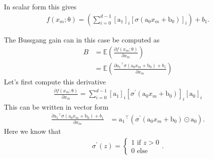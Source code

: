 \documentclass[12pt]{article}
\newcommand{\vect}[1]{\boldsymbol{\mathrm{#1}}}
\newcommand{\expt}[1]{\mathbb{E}\left(#1\right)}
\theoremstyle{remark}
\begin{document}
In scalar form this gives
\begin{align}
	f(x_m; \vect{\theta}) = \left(\sum_{i=0}^{d-1} [\vect{a_1}]_i [\sigma(\vect{a_0}x_m+\vect{b_0})]_i \right)+ b_1.
\end{align}

The Bussgang gain can in this case be computed as
\begin{align}
	B &= \expt{\frac{\partial f(x_m; \vect{\theta})}{\partial x_m}}\\
	&= \expt{\frac{\partial \vect{a_1}^{\intercal}\sigma(\vect{a_0}x_m + \vect{b_0}) + b_1 }{\partial x_m}}
\end{align}
Let's first compute this derivative 
\begin{align}
	\frac{\partial f(x_m; \vect{\theta})}{\partial x_m} = \sum_{i=0}^{d-1} [\vect{a_1}]_i [\sigma^{\prime}(\vect{a}_0x_m+\vect{b_0})]_i [\vect{a_0}]_i
\end{align}
This can be written in vector form
\begin{align}
	\frac{\partial \vect{a_1}^{\intercal}\sigma(\vect{a_0}x_m + \vect{b_0}) + b_1 }{\partial x_m} &= \vect{a_1}^{\intercal} \left(\sigma^{\prime}(\vect{a_0}x_m + \vect{b_0}) \odot \vect{a_0}\right). 
\end{align}
Here we know that 
\begin{align}
	\sigma^{\prime}(z) = \begin{cases}
		1 \text{ if $z>0$}\\
		0 \text{ else}
	\end{cases}.
\end{align}
\end{document}
